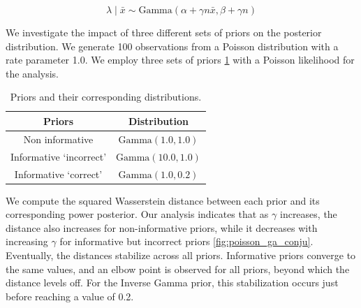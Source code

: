 \documentclass[12pt]{article}
\begin{document}
\begin{equation}
\lambda \; | \; \bar{x} \sim \text{Gamma} \left( \alpha + \gamma n \bar{x}, \beta + \gamma n \right)
\end{equation}

We investigate the impact of three different sets of priors on the posterior distribution. We generate 100 observations from a Poisson distribution with a rate parameter 1.0. We employ three sets of priors \cref{priors_gammaPois} with a Poisson likelihood for the analysis. 
\begin{table}[h!]
	\caption{Priors and their corresponding distributions.}
	\renewcommand{\arraystretch}{1.5}
	\centering
	\begin{tabular}{cc}
		\toprule
		Priors                   & Distribution\\
		\midrule
		Non informative                    &  $\text{Gamma}(1.0, 1.0)$\\
		Informative `incorrect'         & $\text{Gamma}(10.0, 1.0)$\\
		Informative    `correct'               & $\text{Gamma}(1.0, 0.2)$\\
		\bottomrule
	\end{tabular}
	\label{priors_gammaPois}
\end{table}


We compute the squared Wasserstein distance between each prior and its corresponding power posterior. Our analysis indicates that as $\gamma$ increases, the distance also increases for non-informative priors, while it decreases with increasing $\gamma$ for informative but incorrect priors \cref{fig:poisson_ga_conju}. Eventually, the distances stabilize across all priors. Informative priors converge to the same values, and an elbow point is observed for all priors, beyond which the distance levels off. For the Inverse Gamma prior, this stabilization occurs just before reaching a value of 0.2.
\end{document}
